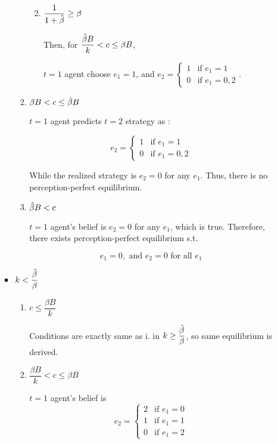 \documentclass{jsarticle}
\begin{document}
\begin{enumerate}
\begin{enumerate}
\begin{itemize}
\begin{enumerate}
\begin{enumerate}
  \vspace{1.5zw}
  
  \item $\dfrac{1}{1 + \Hat{\beta}} \geq \beta$
  
  Then, for $\dfrac{\Hat{\beta}B}{k} < c \leq \beta B$,
  
   $t=1$ agent choose $e_1=1$, and $e_2 = \begin{cases}
  1 & \text{if } e_1=1 \\
  0 & \text{if } e_1=0,2
  \end{cases}$.
 
  
  \end{enumerate}
  
  \item $\beta B < c \leq \Hat{\beta} B $
  
  $t=1$ agent predicts $t=2$ strategy as :
 
  \[e_2 = \begin{cases}
  1 & \text{if } e_1=1 \\
 0 & \text{if } e_1=0,2
 \end{cases} \]
 
 While the realized strategy is $e_2=0$ for any $e_1$. Thus, there is no perception-perfect equilibrium.
 
  \item $\Hat{\beta} B < c$
  
  $t=1$ agent's belief is $e_2=0$ for any $e_1$, which is true. Therefore, there exists perception-perfect equilibrium s.t.
  
  \[e_1=0, \text{ and } e_2=0 \text{ for all }e_1 \]
  
  \end{enumerate}
 
 \newpage
 
 \item $k < \dfrac{\Hat{\beta}}{\beta}$
 
 \begin{enumerate}
  
  \item $c \leq \dfrac{\beta B}{k}$
  
  Conditions are exactly same as i. in $k \geq \dfrac{\Hat{\beta}}{\beta}$, so same equilibrium is derived.
  
  \item $\dfrac{\beta B}{k} < c \leq \beta B $
  
   $t=1$ agent's belief is
 \[e_2 = \begin{cases}
 2 & \text{if } e_1=0 \\
 1 & \text{if } e_1=1 \\
 0 & \text{if } e_1=2
 \end{cases} \]
 

\end{enumerate}
\end{itemize}
\end{enumerate}
\end{enumerate}
\end{document}
